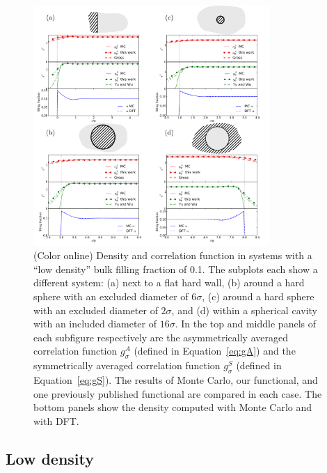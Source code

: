 \begin{figure}
  \noindent\includegraphics[width=0.8\textwidth]{figs/low-density}
  \caption{ (Color online) Density and correlation function in systems
    with a ``low density'' bulk filling fraction of 0.1.  The
    subplots each show a different system: (a) next to a flat hard wall, (b)
    around a hard sphere with an excluded diameter of $6\sigma$, (c)
    around a hard sphere with an excluded diameter of $2\sigma$, and
    (d) within a spherical cavity with an included diameter of $16\sigma$.
    In the top and middle panels of each subfigure respectively are the
    asymmetrically averaged correlation function $g_\sigma^A$ (defined
    in Equation~\ref{eq:gA}) and the symmetrically averaged
    correlation function $g_\sigma^S$ (defined in
    Equation~\ref{eq:gS}).  The results of Monte Carlo, our
    functional, and one previously published
    functional\cite{gross2009density,
      yu2002fmt-dft-inhomogeneous-associating} are compared in each
    case.  The bottom panels show the density computed with
    Monte Carlo and with DFT.}
  \label{fig:low-density}
\end{figure}

\subsection{Low density}

